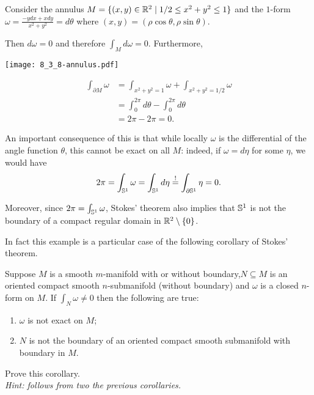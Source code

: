 \begin{example}
  Consider the annulus $M=\{(x,y)\in\mathbb{R}^2 \mid 1/2\leq x^2+y^2 \leq 1\}$ and the $1$-form $\omega = \frac{-y dx + x dy}{x^2 + y^2} = d\theta$ where $(x,y) = (\rho\cos\theta, \rho\sin\theta)$.
  
  Then $d\omega = 0$ and therefore $\int_M d\omega = 0$.
  Furthermore,
  \begin{marginfigure}
    \texttt{[image: 8\_3\_8-annulus.pdf]}
  \end{marginfigure}
  \begin{align}
    \int_{\partial M}\omega
    &= \int_{x^2 + y^2 =1} \omega + \int_{x^2+y^2 =1/2}\omega \\ 
    &= \int_{0}^{2\pi} d\theta - \int_0^{2\pi}d \theta \\
    &= 2\pi - 2\pi = 0.
  \end{align}

  An important consequence of this is that while locally $\omega$ is the differential of the angle function $\theta$, this cannot be exact on all $M$: indeed, if $\omega = d\eta$ for some $\eta$, we would have
  \begin{equation}
    2\pi = \int_{\mathbb{S}^1}\omega = \int_{\mathbb{S}^1}d\eta \overset{!}{=} \int_{\partial\mathbb{S}^1}\eta = 0.
  \end{equation}

  Moreover, since $2\pi = \int_{\mathbb{S}^1}\omega$, Stokes' theorem also implies that $\mathbb{S}^1$ is not the boundary of a compact regular domain in $\mathbb{R}^2\setminus\{0\}$.
\end{example}

In fact this example is a particular case of the following corollary of Stokes' theorem.

\begin{corollary}
  Suppose $M$ is a smooth $m$-manifold with or without boundary,$N\subseteq M$ is an oriented compact smooth $n$-submanifold (without boundary) and $\omega$ is a closed $n$-form on $M$.
  If $\int_N\omega \neq 0$ then the following are true:
  \begin{enumerate}
    \item $\omega$ is not exact on $M$;
    \item $N$ is not the boundary of an oriented compact smooth submanifold with boundary in $M$.
  \end{enumerate}
\end{corollary}
\begin{exercise}
  Prove this corollary. \\
  \textit{\small Hint: follows from two the previous corollaries.}
\end{exercise}



